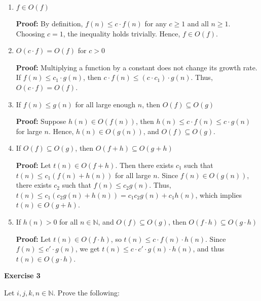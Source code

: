 \documentclass{article}
\theoremstyle{theorem}
\theoremstyle{definition}
\theoremstyle{remark}
\begin{document}
\begin{enumerate}
    \item \( f \in O(f) \)

    \textbf{Proof:} By definition, \( f(n) \leq c \cdot f(n) \) for any \( c \geq 1 \) and all \( n \geq 1 \). Choosing \( c = 1 \), the inequality holds trivially. Hence, \( f \in O(f) \).

    \item \( O(c \cdot f) = O(f) \) for \( c > 0 \)

    \textbf{Proof:} Multiplying a function by a constant does not change its growth rate. If \( f(n) \leq c_1 \cdot g(n) \), then \( c \cdot f(n) \leq (c \cdot c_1) \cdot g(n) \). Thus, \( O(c \cdot f) = O(f) \).

    \item If \( f(n) \leq g(n) \) for all large enough \( n \), then \( O(f) \subseteq O(g) \)

    \textbf{Proof:} Suppose \( h(n) \in O(f(n)) \), then \( h(n) \leq c \cdot f(n) \leq c \cdot g(n) \) for large \( n \). Hence, \( h(n) \in O(g(n)) \), and \( O(f) \subseteq O(g) \).

    \item If \( O(f) \subseteq O(g) \), then \( O(f + h) \subseteq O(g + h) \)

    \textbf{Proof:} Let \( t(n) \in O(f + h) \). Then there exists \( c_1 \) such that \( t(n) \leq c_1(f(n) + h(n)) \) for all large \( n \). Since \( f(n) \in O(g(n)) \), there exists \( c_2 \) such that \( f(n) \leq c_2 g(n) \). Thus, \( t(n) \leq c_1(c_2 g(n) + h(n)) = c_1 c_2 g(n) + c_1 h(n) \), which implies \( t(n) \in O(g + h) \).

    \item If \( h(n) > 0 \) for all \( n \in \mathbb{N} \), and \( O(f) \subseteq O(g) \), then \( O(f \cdot h) \subseteq O(g \cdot h) \)

    \textbf{Proof:} Let \( t(n) \in O(f \cdot h) \), so \( t(n) \leq c \cdot f(n) \cdot h(n) \). Since \( f(n) \leq c' \cdot g(n) \), we get \( t(n) \leq c \cdot c' \cdot g(n) \cdot h(n) \), and thus \( t(n) \in O(g \cdot h) \).
\end{enumerate}

\textbf{Exercise 3}

Let \( i, j, k, n \in \mathbb{N} \). Prove the following:
\end{document}
